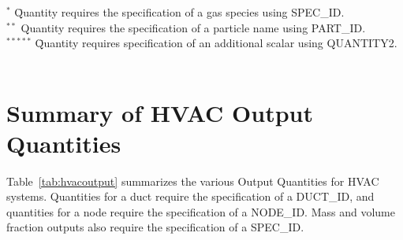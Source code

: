 \documentclass[11pt]{book}
\begin{document}
\noindent
\begin{tabbing}
$^{*}$  \hspace{0.25in} \= Quantity requires the specification of a gas species using {\ct SPEC\_ID}. \\
$^{**}$                \> Quantity requires the specification of a particle name using {\ct PART\_ID}. \\
$^{*****}$ \hspace{0.25in} \=  Quantity requires specification of an additional scalar using {\ct QUANTITY2}. \
\end{tabbing}

\clearpage
\section{Summary of HVAC Output Quantities}
\label{info:hvacoutputquantities}

Table~\ref{tab:hvacoutput} summarizes the various Output Quantities for HVAC systems.  Quantities for a duct require the specification
of a {\ct DUCT\_ID}, and quantities for a node require the specification of a {\ct NODE\_ID}.  Mass and volume fraction outputs also require the specification of a {\ct SPEC\_ID}.
\end{document}
